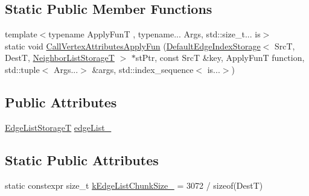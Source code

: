 \subsection*{Static Public Member Functions}
\begin{DoxyCompactItemize}
\item 
{\footnotesize template$<$typename Apply\-Fun\-T , typename... Args, std\-::size\-\_\-t... is$>$ }\\static void \hyperlink{classshad_1_1DefaultEdgeIndexStorage_af6193bd47940b46f931b40301ac714fc}{Call\-Vertex\-Attributes\-Apply\-Fun} (\hyperlink{classshad_1_1DefaultEdgeIndexStorage}{Default\-Edge\-Index\-Storage}$<$ Src\-T, Dest\-T, \hyperlink{classshad_1_1DefaultEdgeIndexStorage_aae1425fda169243d97fa1e39e4417fa5}{Neighbor\-List\-Storage\-T} $>$ $\ast$st\-Ptr, const Src\-T \&key, Apply\-Fun\-T function, std\-::tuple$<$ Args...$>$ \&args, std\-::index\-\_\-sequence$<$ is...$>$)
\end{DoxyCompactItemize}
\subsection*{Public Attributes}
\begin{DoxyCompactItemize}
\item 
\hyperlink{classshad_1_1DefaultEdgeIndexStorage_af083de6d56b46413f55dc5fea0384afa}{Edge\-List\-Storage\-T} \hyperlink{classshad_1_1DefaultEdgeIndexStorage_aa6583a96819d8920897b7a5f4581f849}{edge\-List\-\_\-}
\end{DoxyCompactItemize}
\subsection*{Static Public Attributes}
\begin{DoxyCompactItemize}
\item 
static constexpr size\-\_\-t \hyperlink{classshad_1_1DefaultEdgeIndexStorage_aae9f28f3799a6a274b0249dc1dc4313c}{k\-Edge\-List\-Chunk\-Size\-\_\-} = 3072 / sizeof(Dest\-T)
\end{DoxyCompactItemize}


